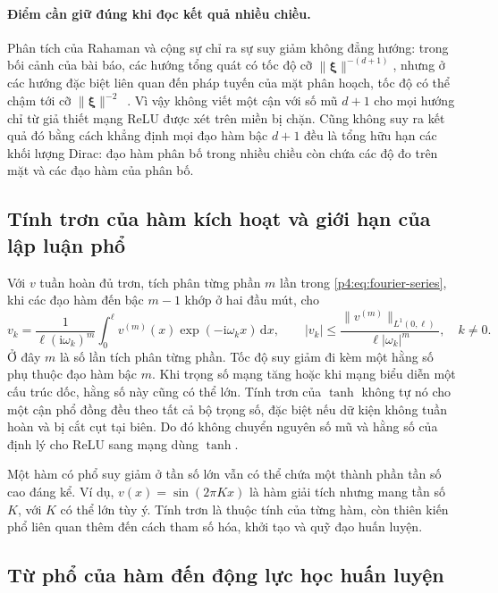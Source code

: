 \paragraph{Điểm cần giữ đúng khi đọc kết quả nhiều chiều.}
Phân tích của Rahaman và cộng sự chỉ ra sự suy giảm không đẳng hướng:
trong bối cảnh của bài báo, các hướng tổng quát có tốc độ cỡ
$\|\boldsymbol{\xi}\|^{-(d+1)}$, nhưng ở các hướng đặc biệt liên quan
đến pháp tuyến của mặt phân hoạch, tốc độ có thể chậm tới cỡ
$\|\boldsymbol{\xi}\|^{-2}$~\cite[Mục~2]{rahaman2019}.
Vì vậy không viết một cận với số mũ $d+1$ cho mọi hướng chỉ từ giả
thiết mạng ReLU được xét trên miền bị chặn. Cũng không suy ra kết
quả đó bằng cách khẳng định mọi đạo hàm bậc $d+1$ đều là tổng hữu hạn
các khối lượng Dirac: đạo hàm phân bố trong nhiều chiều còn chứa các
độ đo trên mặt và các đạo hàm của phân bố.

\subsection{Tính trơn của hàm kích hoạt và giới hạn của lập luận phổ}

Với $v$ tuần hoàn đủ trơn, tích phân từng phần $m$ lần trong
\eqref{p4:eq:fourier-series}, khi các đạo hàm đến bậc $m-1$ khớp ở
hai đầu mút, cho
\begin{equation}
 v_k=\frac{1}{\ell(\mathrm{i}\omega_k)^m}
       \int_0^{\ell}v^{(m)}(x)\exp(-\mathrm{i}\omega_kx)\,\mathrm{d}x,
 \qquad
 |v_k|\leq\frac{\|v^{(m)}\|_{L^1(0,\ell)}}
                              {\ell|\omega_k|^m},\quad k\ne0.
 \label{p4:eq:smooth-decay}
\end{equation}
Ở đây $m$ là số lần tích phân từng phần. Tốc độ suy giảm đi kèm một
hằng số phụ thuộc đạo hàm bậc $m$. Khi trọng số mạng tăng hoặc khi
mạng biểu diễn một cấu trúc dốc, hằng số này cũng có thể lớn.
Tính trơn của $\tanh$ không tự nó cho một cận phổ đồng đều theo tất
cả bộ trọng số, đặc biệt nếu dữ kiện không tuần hoàn và bị cắt cụt
tại biên. Do đó không chuyển nguyên số mũ và hằng số của định lý cho
ReLU sang mạng dùng $\tanh$.

Một hàm có phổ suy giảm ở tần số lớn vẫn có thể chứa một thành phần
tần số cao đáng kể. Ví dụ, $v(x)=\sin(2\pi Kx)$ là hàm giải tích
nhưng mang tần số $K$, với $K$ có thể lớn tùy ý. Tính trơn là thuộc
tính của từng hàm, còn thiên kiến phổ liên quan thêm đến cách tham
số hóa, khởi tạo và quỹ đạo huấn luyện.

\subsection{Từ phổ của hàm đến động lực học huấn luyện}

